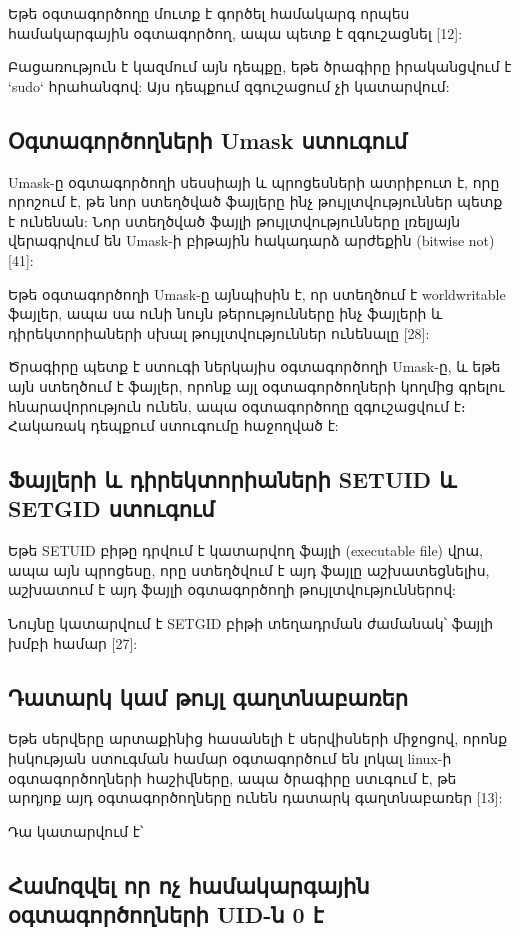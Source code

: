 \documentclass[a4paper,12pt]{article}
\begin{document}
\begin{sloppypar}
Եթե օգտագործողը մուտք է գործել համակարգ որպես
համակարգային օգտագործող, ապա պետք է զգուշացնել [12]:

Բացառություն է կազմում այն դեպքը, եթե ծրագիրը իրականցվում է
`sudo` հրահանգով: Այս դեպքում զգուշացում չի կատարվում:


\subsection{Օգտագործողների Umask ստուգում}


Umask-ը օգտագործողի սեսսիայի և պրոցեսների ատրիբուտ է, որը
որոշում է, թե նոր ստեղծված ֆայլերը ինչ թույլտվություններ
պետք է ունենան: Նոր ստեղծված ֆայլի թույլտվությունները
լռելյայն վերագրվում են Umask-ի բիթային հակադարձ արժեքին (bitwise not) [41]:

Եթե օգտագործողի Umask-ը այնպիսին է, որ ստեղծում է
worldwritable ֆայլեր, ապա սա ունի նույն թերությունները
ինչ ֆայլերի և դիրեկտորիաների սխալ թույլտվություններ ունենալը [28]:

Ծրագիրը պետք է ստուգի ներկայիս օգտագործողի Umask-ը, և եթե այն
ստեղծում է ֆայլեր, որոնք այլ օգտագործողների կողմից գրելու
հնարավորություն ունեն, ապա օգտագործողը զգուշացվում է։ Հակառակ
դեպքում ստուգումը հաջողված է:


\subsection{Ֆայլերի և դիրեկտորիաների SETUID և SETGID ստուգում}


Եթե SETUID բիթը դրվում է կատարվող ֆայլի (executable file) վրա, ապա
այն պրոցեսը, որը ստեղծվում է այդ ֆայլը աշխատեցնելիս,
աշխատում է այդ ֆայլի օգտագործողի թույլտվություններով:

Նույնը կատարվում է SETGID բիթի տեղադրման ժամանակ՝
ֆայլի խմբի համար [27]:


\subsection{Դատարկ կամ թույլ գաղտնաբառեր}

Եթե սերվերը արտաքինից հասանելի է սերվիսների միջոցով,
որոնք իսկության ստուգման համար օգտագործում են լոկալ
linux-ի օգտագործողների հաշիվները, ապա ծրագիրը ստւգում է,
թե արդյոք այդ օգտագործողները ունեն դատարկ գաղտնաբառեր [13]:

Դա կատարվում է՝



\subsection{Համոզվել որ ոչ համակարգային օգտագործողների UID-ն 0 է}


\end{sloppypar}
\end{document}
